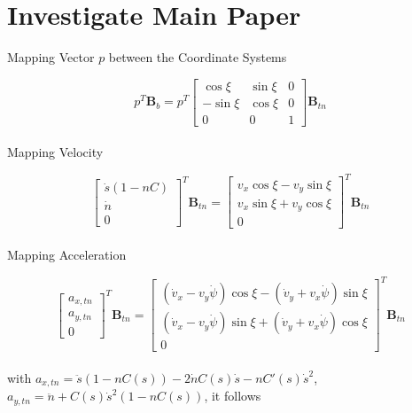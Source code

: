 \chapter{Investigate Main Paper} \label{ch:main-paper}

Mapping Vector $p$ between the Coordinate Systems

\begin{equation}
	p^T\mathbf{B}_b = p^T\begin{bmatrix}
		\cos{\xi}  & \sin{\xi} & 0 \\
		-\sin{\xi} & \cos{\xi} & 0 \\
		0          & 0         & 1
	\end{bmatrix} \mathbf{B}_{tn}
\end{equation}
\\
Mapping Velocity

\begin{equation}
	\label{velocity-mapping}
	\begin{bmatrix}
		\dot{s}(1-nC) \\
		\dot{n}       \\
		0
	\end{bmatrix}^T \mathbf{B}_{tn} = \begin{bmatrix}
		v_x\cos{\xi} - v_y\sin{\xi} \\
		v_x\sin{\xi} + v_y\cos{\xi} \\
		0
	\end{bmatrix}^T \mathbf{B}_{tn}
\end{equation}
\\
Mapping Acceleration

\begin{equation}
	\begin{bmatrix}
		a_{x,tn} \\
		a_{y,tn} \\
		0
	\end{bmatrix}^T \mathbf{B}_{tn} = \begin{bmatrix}
		(\dot{v}_x - v_y\dot{\psi})\cos{\xi} - (\dot{v}_y + v_x\dot{\psi})\sin{\xi} \\
		(\dot{v}_x - v_y\dot{\psi})\sin{\xi} + (\dot{v}_y + v_x\dot{\psi})\cos{\xi} \\
		0
	\end{bmatrix}^T \mathbf{B}_{tn}
\end{equation}
\\
with $a_{x,tn}=\ddot{s}(1-nC(s))-2\dot{n}C(s)\dot{s}-nC'(s)\dot{s}^2$, $a_{y,tn} = \ddot{n}+C(s)\dot{s}^2(1-nC(s))$, it follows

